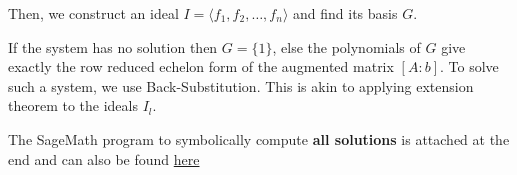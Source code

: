 \documentclass[a4paper,11pt]{article}
\begin{document}
Then, we construct an ideal $I=\langle f_1,f_2,\ldots,f_n\rangle$ and find its \Grob basis $G$.

If the system has no solution then $G=\{1\}$, else the polynomials of $G$ give exactly the row reduced echelon form of the augmented matrix $[A:b]$. To solve such a system, we use 
Back-Substitution. This is akin to applying extension theorem to the ideals $I_{l}$.

The SageMath program to symbolically compute \textbf{all solutions} is attached at the end and can also be found \href{https://github.com/paramrathour/Groebner-Basis-Applications/blob/main/System of Linear Equations Symbolic Solver.ipynb}{here}
% 

    
    
        
    
                    
\end{document}
